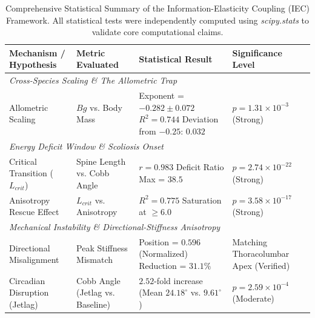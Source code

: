 \begin{table}[h!]
\centering
\caption{Comprehensive Statistical Summary of the Information-Elasticity Coupling (IEC) Framework. All statistical tests were independently computed using \textit{scipy.stats} to validate core computational claims.}
\label{tab:statistical_summary}
\scriptsize
\begin{tabular}{p{3.5cm}p{3cm}p{4cm}p{3.5cm}}
\toprule
\textbf{Mechanism / Hypothesis} & \textbf{Metric Evaluated} & \textbf{Statistical Result} & \textbf{Significance Level} \\
\midrule
\multicolumn{4}{l}{\textit{Cross-Species Scaling \& The Allometric Trap}} \\
Allometric Scaling & $Bg$ vs. Body Mass & Exponent = $-0.282 \pm 0.072$ \newline $R^2 = 0.744$ \newline Deviation from $-0.25$: $0.032$ & $p = 1.31 \times 10^{-3}$ \newline (Strong) \\
\midrule
\multicolumn{4}{l}{\textit{Energy Deficit Window \& Scoliosis Onset}} \\
Critical Transition ($L_{crit}$) & Spine Length vs. Cobb Angle & $r = 0.983$ \newline Deficit Ratio Max = $38.5$ & $p = 2.74 \times 10^{-22}$ \newline (Strong) \\
Anisotropy Rescue Effect & $L_{crit}$ vs. Anisotropy & $R^2 = 0.775$ \newline Saturation at $\ge 6.0$ & $p = 3.58 \times 10^{-17}$ \newline (Strong) \\
\midrule
\multicolumn{4}{l}{\textit{Mechanical Instability \& Directional-Stiffness Anisotropy}} \\
Directional Misalignment & Peak Stiffness Mismatch & Position = $0.596$ (Normalized) \newline Reduction = $31.1\%$ & Matching Thoracolumbar Apex (Verified) \\
Circadian Disruption (Jetlag) & Cobb Angle (Jetlag vs. Baseline) & $2.52$-fold increase \newline (Mean $24.18^\circ$ vs. $9.61^\circ$) & $p = 2.59 \times 10^{-4}$ \newline (Moderate) \\
\bottomrule
\end{tabular}
\end{table}
